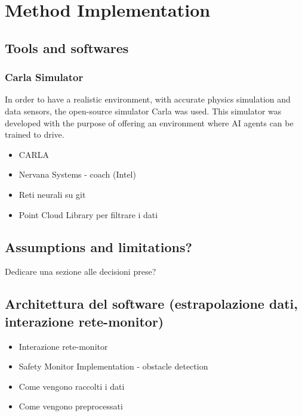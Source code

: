 \chapter{Method Implementation}

\section{Tools and softwares}

\subsection{Carla Simulator}

In order to have a realistic environment, with accurate physics simulation and data sensors, the open-source simulator Carla was used. This simulator was developed with the purpose of offering an environment where AI agents can be trained to drive.\newline

\begin{itemize}
	\item CARLA
	\item Nervana Systems - coach (Intel)
	\item Reti neurali su git
	\item Point Cloud Library per filtrare i dati
\end{itemize}


\section{Assumptions and limitations?}

Dedicare una sezione alle decisioni prese?

\section{Architettura del software (estrapolazione dati, interazione rete-monitor)}

\begin{itemize}
	
	\item Interazione rete-monitor
	\item Safety Monitor Implementation - obstacle detection
	\item Come vengono raccolti i dati
	\item Come vengono preprocessati
	
\end{itemize}


